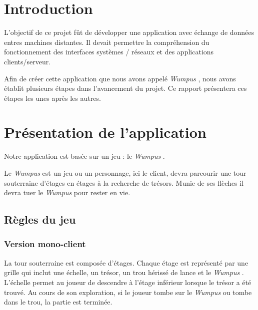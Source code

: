 \documentclass[a4paper,10pt]{article}
\newcommand{\gameName}{\emph{Wumpus }}
\begin{document}
	\newpage
	\tableofcontents

	\newpage
	\pagestyle{fancy}

	\section{Introduction}
L'objectif de ce projet fût de développer une application avec échange de données entres machines distantes. Il devait permettre la compréhension du fonctionnement des interfaces systèmes / réseaux et des applications clients/serveur.

	Afin de créer cette application que nous avons appelé \gameName, nous avons établit plusieurs étapes dans l'avancement du projet. Ce rapport
	présentera  ces étapes  les unes après  les autres.


	\newpage
	\section{Présentation de l'application}
	Notre application est basée sur un jeu : le \gameName.

	Le \gameName est un jeu ou un personnage, ici le client, devra parcourir une tour souterraine d'étages en étages à la recherche de trésors. %
	Munie de ses flèches il devra tuer le \gameName pour rester en vie.

	\subsection{Règles du jeu}
		\subsubsection{Version mono-client}
			La tour souterraine est composée d'étages.
			Chaque étage est représenté par une grille qui inclut une échelle, un trésor, un trou hérissé de lance et le \gameName.
			L'échelle permet au joueur de descendre à l'étage inférieur lorsque le trésor a été trouvé. Au cours de son exploration, si le joueur tombe sur le
	\gameName ou tombe dans le trou, la partie est terminée.
\end{document}
